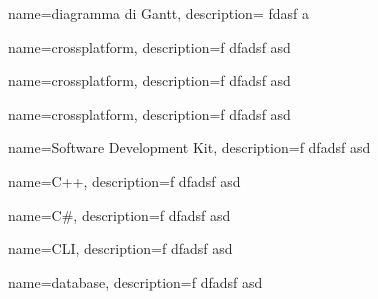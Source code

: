 {
  name=diagramma di Gantt,
  description={ fdasf a}
}

{
  name=crossplatform,
  description={f dfadsf asd }
}

{
  name=crossplatform,
  description={f dfadsf asd }
}

{
  name=crossplatform,
  description={f dfadsf asd }
}

{
  name=Software Development Kit,
  description={f dfadsf asd }
}


{
  name=C++,
  description={f dfadsf asd }
}

{
  name=C\#,
  description={f dfadsf asd }
}

{
  name=CLI,
  description={f dfadsf asd }
}

{
  name=database,
  description={f dfadsf asd }
}